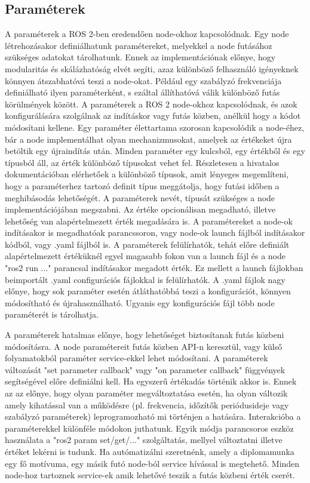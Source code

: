 \subsection{Paraméterek}
A paraméterek a ROS 2-ben eredendően node-okhoz kapcsolódnak. Egy node létrehozásakor definiálhatunk paramétereket, melyekkel a node futásához szükséges adatokat tárolhatunk. Ennek az implementációnak előnye, hogy modularitás és skálázhatóság elvét segíti, azaz különböző felhasználó igényeknek könnyen átszabhatóvá teszi a node-okat. Például egy szabályzó frekvenciája definiálható ilyen paraméterként, s ezáltal állíthatóvá válik különböző futás körülmények között. A paraméterek a ROS 2 node-okhoz kapcsolódnak, és azok konfigurálására szolgálnak az indításkor vagy futás közben, anélkül hogy a kódot módosítani kellene. Egy paraméter élettartama szorosan kapcsolódik a node-éhez, bár a node implementálhat olyan mechanizmusokat, amelyek az értékeket újra betöltik egy újraindítás után. Minden paraméter egy kulcsból, egy értékből és egy típusból áll, az érték különböző típusokat vehet fel. Részletesen a hivatalos dokumentációban elérhetőek a különböző típusok, amit lényeges megemlíteni, hogy a paraméterhez tartozó definit típus meggátolja, hogy futási időben a meghibásodás lehetőségét. A paraméterek nevét, típusát szükséges a node implementációjában megszabni. Az értéke opcionálisan megadható, illetve lehetőség van alapértelmezett érték megadására is. A paramétereket a node-ok indításakor is megadhatóak parancssoron, vagy node-ok launch fájlból indításakor kódból, vagy .yaml fájlból is. A paraméterek felülírhatók, tehát előre definiált alapértelmezett értéküknél egyel magasabb fokon van a launch fájl és a node "ros2 run ..." parancsal indításakor megadott érték. Ez mellett a launch fájlokban beimportált .yaml configurációs fájlokkal is felülírhatók. A .yaml fájlok nagy előnye, hogy sok paraméter esetén átláthatóbbá teszi a konfigurációt, könnyen módosítható és újrahasználható. Ugyanis egy konfigurációs fájl több node paraméterét is tárolhatja.

A paraméterek hatalmas előnye, hogy lehetőséget biztosítanak futás közbeni módosításra.  A node paramétereit futás közben API-n keresztül, vagy külső folyamatokból paraméter service-ekkel lehet módosítani. A paraméterek változását "set parameter callback" vagy "on parameter callback" függvények segítségével előre definiálni kell. Ha egyszerű értékadás történik akkor is. Ennek az az előnye, hogy olyan paraméter megváltoztatása esetén, ha olyan változik amely kihatással van a működésre (pl. frekvencia, időzítők periódusideje vagy szabályzó paraméterek) leprogramozható mi történjen a hatására. Interakcióba a paraméterekkel különféle módokon juthatunk. Egyik módja parancsoros eszköz használata a "ros2 param set/get/..." szolgáltatás, mellyel változtatni illetve értéket lekérni is tudunk. Ha autómatizálni szeretnénk, amely a diplomamunka egy fő motívuma, egy másik futó node-ból service hívással is megtehető. Minden node-hoz tartoznek service-ek amik lehetővé teszik a futás közbeni érték cserét. \cite{ros2} \cite{ros2_design}

